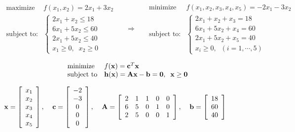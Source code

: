 \documentclass{article}
\def\lthtmlcheckvsize{\ifdim\ht\sizebox<\vsize 
  \ifdim\wd\sizebox<\hsize\expandafter\hfill\fi \expandafter\vfill
  \else\expandafter\vss\fi}%
\begin{document}
{\newpage\clearpage
{}%
\begin{displaymath}\begin{array}{ll}
\mbox{maximize}    & f(x_1,x_2)=2x_1+3x_2 \\
\mbox{subject to:} &
\left\{ \begin{array}{l}
2x_1+ x_2 \le 18\\6x_1+5x_2 \le 60 \\2x_1+5x_2 \le 40 \\x_1 \ge 0,\;\; x_2\ge 0
\end{array}\right.
\end{array}
\;\;\;\;\;\Longrightarrow\;\;\;\;\;
\begin{array}{ll}
\mbox{minimize}    & f(x_1,x_2,x_3,x_4,x_5)=-2x_1-3x_2 \\
\mbox{subject to:} &
\left\{ \begin{array}{l}
2x_1+x_2+x_3=18\\6x_1+5x_2+x_4=60 \\2x_1+5x_2+x_5=40 \\x_i \ge 0,\;\;(i=1,\cdots,5)
\end{array}\right.
\end{array}\end{displaymath}%
\lthtmldisplayZ
\lthtmlcheckvsize\clearpage}

{\newpage\clearpage
{}%
\begin{displaymath}\begin{array}{ll}
\mbox{minimize}    & f({\bf x})={\bf c}^T{\bf x} \\
\mbox{subject to}  & {\bf h}({\bf x})={\bf A}{\bf x}-{\bf b}={\bf0},\;\;{\bf x}\ge {\bf0}
\end{array}\end{displaymath}%
\lthtmldisplayZ
\lthtmlcheckvsize\clearpage}

{\newpage\clearpage
{}%
$\displaystyle {\bf x}=\left[\begin{array}{c}x_1\\x_2\\x_3\\x_4\\x_5\end{array}\right],\;\;\;\;
{\bf c}=\left[\begin{array}{c}-2\\-3\\0\\0\\0\end{array}\right],\;\;\;\;
{\bf A}=\left[\begin{array}{ccccc}2&1&1&0&0\\6&5&0&1&0\\2&5&0&0&1\end{array}\right],\;\;\;\;
{\bf b}=\left[\begin{array}{c}18\\60\\40\end{array}\right]$%
\lthtmlindisplaymathZ
\lthtmlcheckvsize\clearpage}
\end{document}
